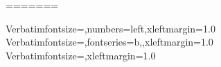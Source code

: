 %
%
%
\newenvironment{sreitems}[1]{%
     \begin{list}{}{%
       \settowidth{\labelwidth}{#1}%
       \setlength{\leftmargin}{\labelwidth}%
       \addtolength{\leftmargin}{\labelsep}%
       }}
     {\end{list}}
=======
\newcommand{\ccode}[1]{{\smaller\texttt{#1}}}
\newcommand{\ccodeincmd}[1]{{\texttt{#1}}}
\newcommand{\emcode}[1]{{\smaller\texttt{\textbf{#1}}}}
\newcommand{\itcode}[1]{{\smaller\texttt{\textit{#1}}}}
\newcommand{\itbfcode}[1]{{\smaller\texttt{\textit{\bfseries #1}}}}
\newcommand{\esldef}[1]{\textbf{#1}}                    %
\newcommand{\prog}[1]{{\smaller\textsc{#1}}}
\newcommand{\eslmod}[1]{{\smaller\textsf{\textup{\textbf{#1}}}}}
\newcommand{\eslmodincmd}[1]{{\smaller\textsf{\textup{\textbf{#1}}}}}
\newcommand{\user}[1]{\indent\indent{\small\bfseries\texttt{> #1}}}
\newcommand{\response}[1]{\indent\indent{\small\texttt{#1}}}

\newcommand{\Easel}    {Easel}
\newcommand{\HMMER}    {HMMER}
\newcommand{\Infernal} {Infernal}
\newcommand{\Pfam}     {Pfam}
\newcommand{\Rfam}     {Rfam}

\newcommand{\apisubhead}[1]{\multicolumn{2}{|c|}{\rule[-0.4em]{0em}{1.5em}\textbf{#1}}}

\def\argmax{\mathop{\mathrm{argmax}}\limits}
\def\argmin{\mathop{\mathrm{argmin}}\limits}

       {Verbatim}{fontsize=\scriptsize,numbers=left,xleftmargin=1.0\parindent}%
    {Verbatim}{fontsize=\small,fontseries=b,,xleftmargin=1.0\parindent}%
%
     {Verbatim}{fontsize=\scriptsize,xleftmargin=1.0\parindent}%

\renewcommand{\theFancyVerbLine}{\tiny\textcolor{SkyBlue}{\arabic{FancyVerbLine}}}


